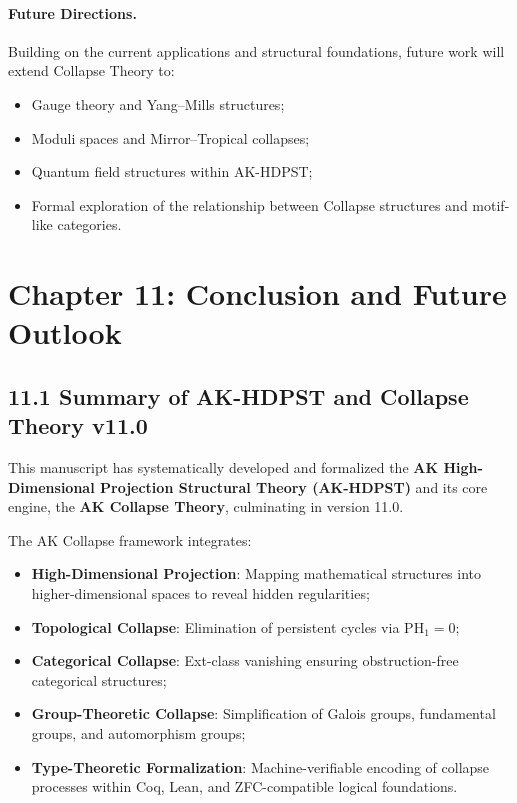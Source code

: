 \documentclass[11pt]{article}
\begin{document}
\paragraph{Future Directions.}

Building on the current applications and structural foundations, future work will extend Collapse Theory to:

\begin{itemize}
    \item Gauge theory and Yang–Mills structures;
    \item Moduli spaces and Mirror–Tropical collapses;
    \item Quantum field structures within AK-HDPST;
    \item Formal exploration of the relationship between Collapse structures and motif-like categories.
\end{itemize}




\section{Chapter 11: Conclusion and Future Outlook}

\subsection*{11.1 Summary of AK-HDPST and Collapse Theory v11.0}

This manuscript has systematically developed and formalized the \textbf{AK High-Dimensional Projection Structural Theory (AK-HDPST)} and its core engine, the \textbf{AK Collapse Theory}, culminating in version 11.0.

The AK Collapse framework integrates:

\begin{itemize}
    \item \textbf{High-Dimensional Projection}: Mapping mathematical structures into higher-dimensional spaces to reveal hidden regularities;
    \item \textbf{Topological Collapse}: Elimination of persistent cycles via \( \mathrm{PH}_1 = 0 \);
    \item \textbf{Categorical Collapse}: Ext-class vanishing ensuring obstruction-free categorical structures;
    \item \textbf{Group-Theoretic Collapse}: Simplification of Galois groups, fundamental groups, and automorphism groups;
    \item \textbf{Type-Theoretic Formalization}: Machine-verifiable encoding of collapse processes within Coq, Lean, and ZFC-compatible logical foundations.
\end{itemize}
\end{document}
